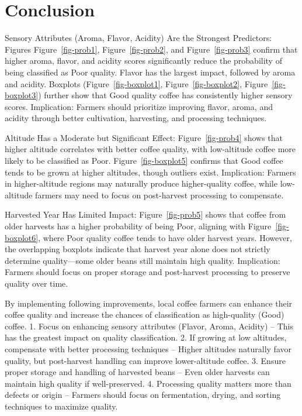 \documentclass[
  letterpaper,
  DIV=11,
  numbers=noendperiod]{scrartcl}
\begin{document}
\section{Conclusion}\label{conclusion}

Sensory Attributes (Aroma, Flavor, Acidity) Are the Strongest
Predictors: Figures Figure~\ref{fig-prob1}, Figure~\ref{fig-prob2}, and
Figure~\ref{fig-prob3} confirm that higher aroma, flavor, and acidity
scores significantly reduce the probability of being classified as Poor
quality. Flavor has the largest impact, followed by aroma and acidity.
Boxplots (Figure~\ref{fig-boxplot1}, Figure~\ref{fig-boxplot2},
Figure~\ref{fig-boxplot3}) further show that Good quality coffee has
consistently higher sensory scores. Implication: Farmers should
prioritize improving flavor, aroma, and acidity through better
cultivation, harvesting, and processing techniques.

Altitude Has a Moderate but Significant Effect: Figure~\ref{fig-prob4}
shows that higher altitude correlates with better coffee quality, with
low-altitude coffee more likely to be classified as Poor.
Figure~\ref{fig-boxplot5} confirms that Good coffee tends to be grown at
higher altitudes, though outliers exist. Implication: Farmers in
higher-altitude regions may naturally produce higher-quality coffee,
while low-altitude farmers may need to focus on post-harvest processing
to compensate.

Harvested Year Has Limited Impact: Figure~\ref{fig-prob5} shows that
coffee from older harvests has a higher probability of being Poor,
aligning with Figure~\ref{fig-boxplot6}, where Poor quality coffee tends
to have older harvest years. However, the overlapping boxplots indicate
that harvest year alone does not strictly determine quality---some older
beans still maintain high quality. Implication: Farmers should focus on
proper storage and post-harvest processing to preserve quality over
time.

By implementing following improvements, local coffee farmers can enhance
their coffee quality and increase the chances of classification as
high-quality (Good) coffee. 1. Focus on enhancing sensory attributes
(Flavor, Aroma, Acidity) -- This has the greatest impact on quality
classification. 2. If growing at low altitudes, compensate with better
processing techniques -- Higher altitudes naturally favor quality, but
post-harvest handling can improve lower-altitude coffee. 3. Ensure
proper storage and handling of harvested beans -- Even older harvests
can maintain high quality if well-preserved. 4. Processing quality
matters more than defects or origin -- Farmers should focus on
fermentation, drying, and sorting techniques to maximize quality.
\end{document}
